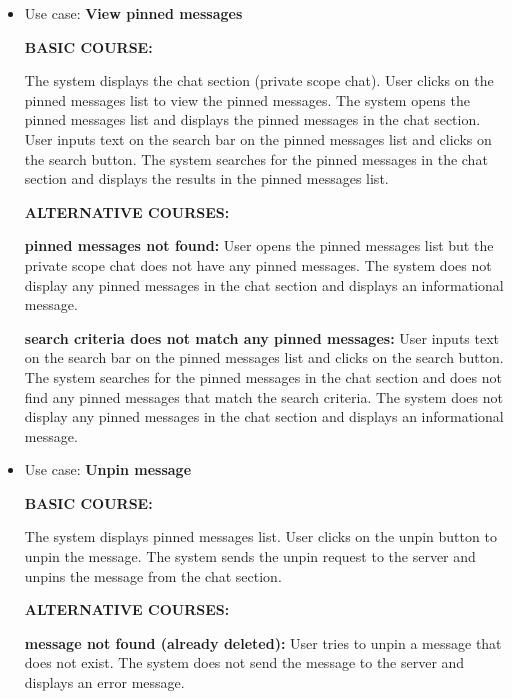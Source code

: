 \documentclass[]{VUMIFTemplateClass}
\begin{document}
\begin{itemize}
    \textbf{message already pinned:}
    User tries to pin a message that is already pinned. The system does not send the message to the server and displays an error message.

    \textbf{global scope chat:}
    User tries to pin a message in the global scope chat. The system does not send the message to the server and displays an error message. User is informed that pinning messages is only available in the private scope chat.

    \item 
    Use case: \textbf{View pinned messages}

    \textbf{BASIC COURSE:}

    The system displays the chat section (private scope chat). User clicks on the pinned messages list to view the pinned messages. The system opens the pinned messages list and displays the pinned messages in the chat section. User inputs text on the search bar on the pinned messages list and clicks on the search button. The system searches for the pinned messages in the chat section and displays the results in the pinned messages list.

    \textbf{ALTERNATIVE COURSES:}

    \textbf{pinned messages not found:}
    User opens the pinned messages list but the private scope chat does not have any pinned messages. The system does not display any pinned messages in the chat section and displays an informational message.

    \textbf{search criteria does not match any pinned messages:}
    User inputs text on the search bar on the pinned messages list and clicks on the search button. The system searches for the pinned messages in the chat section and does not find any pinned messages that match the search criteria. The system does not display any pinned messages in the chat section and displays an informational message.

    \item 
    Use case: \textbf{Unpin message}

    \textbf{BASIC COURSE:}

    The system displays pinned messages list. User clicks on the unpin button to unpin the message. The system sends the unpin request to the server and unpins the message from the chat section.

    \textbf{ALTERNATIVE COURSES:}

    \textbf{message not found (already deleted):}
    User tries to unpin a message that does not exist. The system does not send the message to the server and displays an error message.


\end{itemize}
\end{document}
